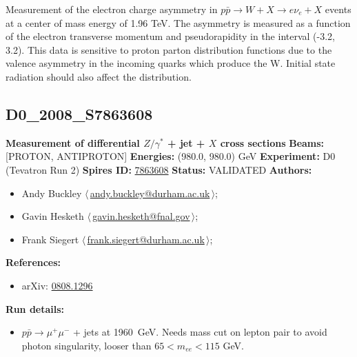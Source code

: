\noindent Measurement of the electron charge asymmetry in $p \bar p \to W + X \to e \nu_e + X$ events at a center of mass energy of 1.96 TeV. The asymmetry is measured as a function of the electron transverse momentum and pseudorapidity in the interval (-3.2, 3.2).  This data is sensitive to proton parton distribution functions due to the valence asymmetry in the incoming quarks which produce the W. Initial state radiation should also affect the \pT distribution.

\clearpage


\clearpage

\subsection[D0\_2008\_S7863608]{D0\_2008\_S7863608\,\cite{Abazov:2008ez}}
\textbf{Measurement of differential $Z/\gamma^*$ + jet + $X$ cross sections}\newline
\textbf{Beams:} [PROTON, ANTIPROTON] \newline
\textbf{Energies:} (980.0, 980.0) GeV \newline
\textbf{Experiment:} D0 (Tevatron Run 2) \newline
\textbf{Spires ID:} \href{http://www.slac.stanford.edu/spires/find/hep/www?rawcmd=key+7863608}{7863608}\newline
\textbf{Status:} VALIDATED\newline
\textbf{Authors:}
\begin{itemize}
  \item Andy Buckley $\langle\,$\href{mailto:andy.buckley@durham.ac.uk}{andy.buckley@durham.ac.uk}$\,\rangle$;
  \item Gavin Hesketh $\langle\,$\href{mailto:gavin.hesketh@fnal.gov}{gavin.hesketh@fnal.gov}$\,\rangle$;
  \item Frank Siegert $\langle\,$\href{mailto:frank.siegert@durham.ac.uk}{frank.siegert@durham.ac.uk}$\,\rangle$;
\end{itemize}
\textbf{References:}
\begin{itemize}
  \item arXiv: \href{http://arxiv.org/abs/0808.1296}{0808.1296}
\end{itemize}
\textbf{Run details:}
\begin{itemize}

  \item $p \bar{p} \to \mu^+ \mu^-$ + jets at 1960~GeV. Needs mass cut on lepton pair to avoid photon singularity, looser than $65 < m_{ee} < 115$ GeV.\end{itemize}

